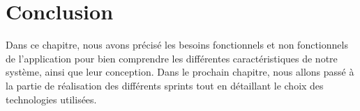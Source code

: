 \section{Conclusion}
    Dans ce chapitre, nous avons précisé les besoins fonctionnels et non fonctionnels de l’application pour bien comprendre les différentes caractéristiques de notre système, ainsi que leur conception.
\newline
Dans le prochain chapitre, nous allons passé à la partie de réalisation des différents sprints tout en détaillant le choix des technologies utilisées.